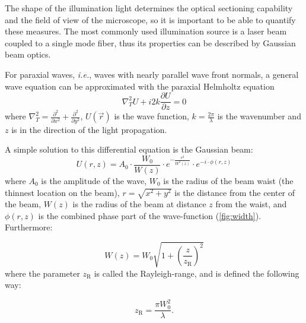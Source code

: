     The shape of the illumination light determines the optical sectioning capability and the field of view of the microscope, so it is important to be able to quantify these measures. The most commonly used illumination source is a laser beam coupled to a single mode fiber, thus its properties can be described by Gaussian beam optics.

    For paraxial waves, \textit{i.e.}, waves with nearly parallel wave front normals, a general wave equation can be approximated with the paraxial Helmholtz equation \cite{saleh_fundamentals_2007}
    \begin{equation}
      \nabla_T^2 U + i 2k \frac{\partial U}{\partial z} = 0
      \label{eq:helmholtz}
    \end{equation}
    where $\nabla_T^2 = \frac{\partial^2}{\partial x^2} + \frac{\partial^2}{\partial y^2}$, $U(\vec{r})$ is the wave function, $k=\frac{2\pi}{\lambda}$ is the wavenumber and $z$ is in the direction of the light propagation.
    
    A simple solution to this differential equation is the Gaussian beam:
    \begin{equation}
      U(r,z) = A_0 \cdot \frac{W_0}{W(z)} \cdot e^{-\frac{r^2}{W^2(z)}}\cdot e^{-i\cdot \phi(r,z)}
    \label{eq:gaussian}
    \end{equation}
    where $A_0$ is the amplitude of the wave, $W_0$ is the radius of the beam waist (the thinnest location on the beam), $r=\sqrt{x^2+y^2}$ is the distance from the center of the beam, $W(z)$ is the radius of the beam  at distance $z$ from the waist, and $\phi(r,z)$ is the combined phase part of the wave-function (\autoref{fig:width}). Furthermore:

    \begin{equation}
      W(z) = W_0\sqrt{1+\left( \frac{z}{z_\mathrm{R}} \right)^2}
    \end{equation}
    where the parameter $z_\mathrm{R}$ is called the Rayleigh-range, and is defined the following way:

    \begin{equation}
      z_\mathrm{R} = \frac{\pi W_0^2}{\lambda}.
      \label{eq:rayleigh}
    \end{equation}
    


